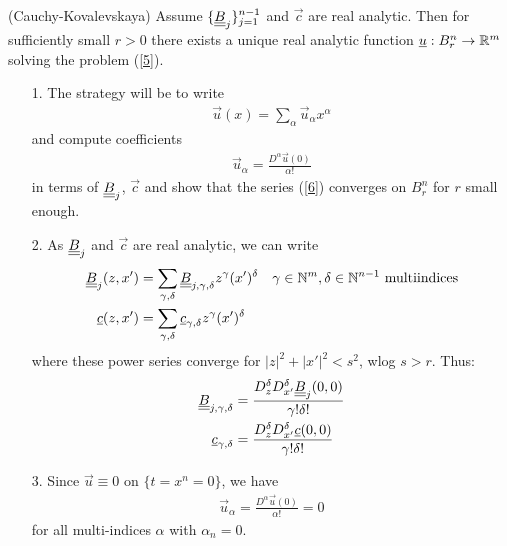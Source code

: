 \documentclass[10pt,a4paper]{report}
\newenvironment{proof}
{\begin{changemargin}{1cm}{0.5cm} 
	}%
	{\end{changemargin}
}
\begin{document}
\thm (Cauchy-Kovalevskaya) Assume $\{\underline{\underline{B}}_j \}_{j=1}^{n-1}$ and $\vec{c}$ are real analytic. Then for sufficiently small $r>0$ there exists a unique real analytic function $\underline{u} : B_r^n \rightarrow \mathbb{R}^m$ solving the problem (\ref{5}).
\begin{proof}
\pf \begin{itemize}
\item[1.] The strategy will be to write
\begin{align}
\vec{u}(x)  = \sum_{\alpha} \vec{u}_{\alpha}x^{\alpha} \label{6}
\end{align}
and compute coefficients
\begin{align*}
\vec{u}_{\alpha} = \frac{D^{\alpha } \vec{u}(0)}{\alpha !}
\end{align*}
in terms of $\underline{\underline{B}}_j$, $\vec{c}$ and show that the series (\ref{6}) converges on $B_r^n$ for $r$ small enough.

\item[2.] As $\underline{\underline{B}}_j$ and $\vec{c}$ are real analytic, we can write
\begin{align*}
\underline{\underline{B}}_j(z,x') &= \sum_{\gamma, \delta} \underline{\underline{B}}_{j,\gamma,\delta}z^{\gamma}(x')^{ \delta} \quad \gamma\in \mathbb{N}^m,\delta \in \mathbb{N}^{n-1} \text{ multiindices} \\
\underline{c}(z,x') & = \sum_{\gamma, \delta} \underline{c}_{\gamma, \delta} z^{\gamma}(x')^{ \delta}
\end{align*}
where these power series converge for $ |z|^2 + |x'|^2 <s^2$, wlog $s>r$.
Thus:
\begin{align}
\underline{\underline{B}}_{j, \gamma, \delta} &= \frac{D_z^{\delta} D_{x'}^{\delta} \underline{\underline{B}}_{j}(0,0)}{\gamma ! \delta !} \label{7}\\
\underline{c}_{\gamma, \delta} &= \frac{D_z^{\delta} D_{x'}^{\delta} \underline{c}(0,0)}{\gamma ! \delta !} \nonumber
\end{align}

\item[3.] Since $\vec{u} \equiv 0$ on $\{ t=x^n =0 \}$, we have
\begin{align*}
\vec{u}_{\alpha} = \frac{D^{\alpha}\vec{u}(0)}{\alpha !} = 0
\end{align*}
for all multi-indices $\alpha$ with $\alpha_n=0$.


\end{itemize}
\end{proof}
\end{document}
